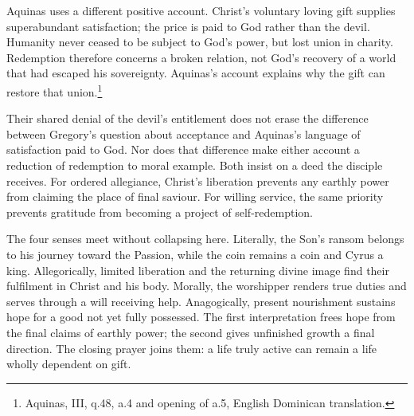 Aquinas uses a different positive account. Christ's voluntary loving gift supplies superabundant satisfaction; the price is paid to God rather than the devil. Humanity never ceased to be subject to God's power, but lost union in charity. Redemption therefore concerns a broken relation, not God's recovery of a world that had escaped his sovereignty. Aquinas's account explains why the gift can restore that union.\footnote{Aquinas,  III, q.48, a.4 and opening of a.5, English Dominican translation.}

Their shared denial of the devil's entitlement does not erase the difference between Gregory's question about acceptance and Aquinas's language of satisfaction paid to God. Nor does that difference make either account a reduction of redemption to moral example. Both insist on a deed the disciple receives. For ordered allegiance, Christ's liberation prevents any earthly power from claiming the place of final saviour. For willing service, the same priority prevents gratitude from becoming a project of self-redemption.

The four senses meet without collapsing here. Literally, the Son's ransom belongs to his journey toward the Passion, while the coin remains a coin and Cyrus a king. Allegorically, limited liberation and the returning divine image find their fulfilment in Christ and his body. Morally, the worshipper renders true duties and serves through a will receiving help. Anagogically, present nourishment sustains hope for a good not yet fully possessed. The first interpretation frees hope from the final claims of earthly power; the second gives unfinished growth a final direction. The closing prayer joins them: a life truly active can remain a life wholly dependent on gift.
